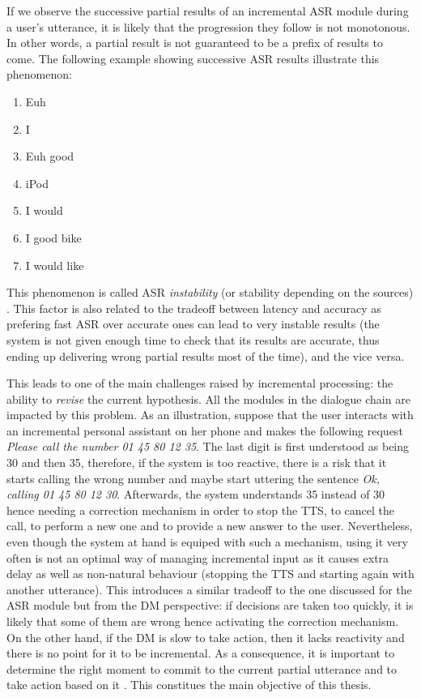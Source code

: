 		If we observe the successive partial results of an incremental ASR module during a user's utterance, it is likely that the progression they follow is not monotonous. In other words, a partial result is not guaranteed to be a prefix of results to come. The following example showing successive ASR results illustrate this phenomenon:

		\begin{enumerate}
			\item Euh
			\item I
			\item Euh good
			\item iPod
			\item I would
			\item I good bike
			\item I would like
		\end{enumerate}

		This phenomenon is called ASR \textit{instability} (or stability depending on the sources) \cite{Selfridge2011}. This factor is also related to the tradeoff between latency and accuracy as prefering fast ASR over accurate ones can lead to very instable results (the system is not given enough time to check that its results are accurate, thus ending up delivering wrong partial results most of the time), and the vice versa.
		
This leads to one of the main challenges raised by incremental processing: the ability to \textit{revise} the current hypothesis. All the modules in the dialogue chain are impacted by this problem. As an illustration, suppose that the user interacts with an incremental personal assistant on her phone and makes the following request \textit{Please call the number 01 45 80 12 35}. The last digit is first understood as being 30 and then 35, therefore, if the system is too reactive, there is a risk that it starts calling the wrong number and maybe start uttering the sentence \textit{Ok, calling 01 45 80 12 30}. Afterwards, the system understands 35 instead of 30 hence needing a correction mechanism in order to stop the TTS, to cancel the call, to perform a new one and to provide a new answer to the user. Nevertheless, even though the system at hand is equiped with such a mechanism, using it very often is not an optimal way of managing incremental input as it causes extra delay as well as non-natural behaviour (stopping the TTS and starting again with another utterance). This introduces a similar tradeoff to the one discussed for the ASR module but from the DM perspective: if decisions are taken too quickly, it is likely that some of them are wrong hence activating the correction mechanism. On the other hand, if the DM is slow to take action, then it lacks reactivity and there is no point for it to be incremental. As a consequence, it is important to determine the right moment to commit to the current partial utterance and to take action based on it \cite{Raux2008,Lu2011}. This constitues the main objective of this thesis.


